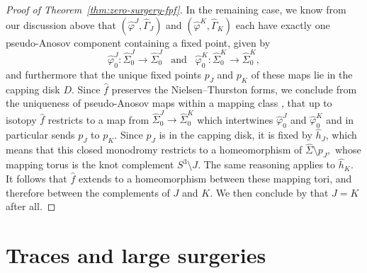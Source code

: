 \documentclass[11pt]{amsart}
\numberwithin{equation}{section}
\numberwithin{theorem}{section}
\theoremstyle{definition}
\begin{document}
\begin{proof}[Proof of Theorem~\ref{thm:zero-surgery-fpf}]
In the remaining case, we know from our discussion above that $(\hat\varphi^J,\hat\Gamma_J)$ and $(\hat\varphi^K,\hat\Gamma_K)$ each have exactly one pseudo-Anosov component containing a fixed point, given by   \[\hat\varphi^J_0:\hat\Sigma_0^J\to\hat\Sigma_0^J\,\,\, \textrm{ and }\,\,\,  \hat\varphi^K_0: \hat\Sigma_0^K\to \hat\Sigma_0^K,\] and furthermore that the unique fixed points  $p_J$ and $p_K$ of these maps lie in the capping disk $D$.   Since $\hat{f}$ preserves the Nielsen--Thurston forms, we conclude from the uniqueness of pseudo-Anosov maps within a mapping class \cite[Expos\'e~12]{flp}, that up to isotopy $\hat{f}$ restricts to a map from $\hat\Sigma^J_0 \to \hat\Sigma^K_0$ which intertwines  $\hat\varphi^J_0$ and $\hat\varphi^K_0$ and in particular sends $p_J$ to $p_K$. 
Since $p_J$ is in the capping disk, it is fixed by $\hat h_J$, which means that this closed monodromy restricts to a homeomorphism of $\hat\Sigma\setminus p_J,$
whose mapping torus is the knot complement $S^3\setminus J$. The same reasoning applies to $\hat h_K$. It follows that  $\hat f$ extends to a homeomorphism between these mapping tori, and therefore between the  complements of $J$ and $K$. We then conclude by \cite{gordon-luecke-complement} that $J=K$ after all.
\end{proof}

%
%
%
%
%

\section{Traces and large surgeries} \label{sec:large-surgeries}
\end{document}
